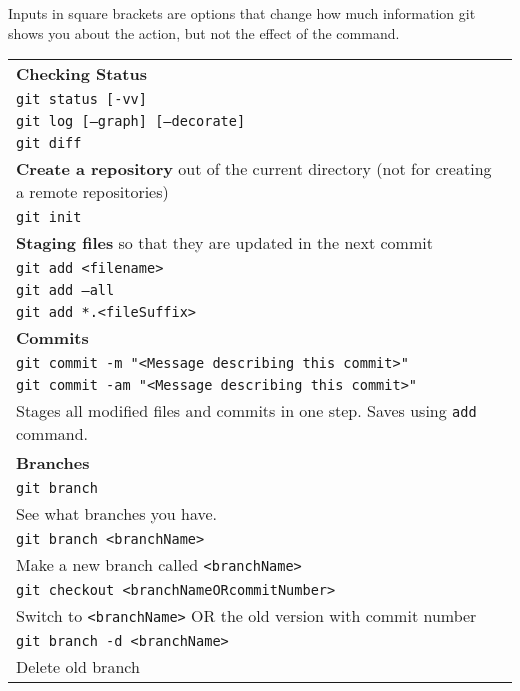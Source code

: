 \documentclass[11pt]{article}
\newcommand{\smallbold}[1]{\footnotesize\textbf{#1}}
\begin{document}
{\small Inputs in square brackets are options that change how much information git shows you about the action, but not the effect of the command.

\begin{center}
\begin{tabular}{|l|}
\hline
\smallbold{Checking Status}\\
\quad \texttt{git status [-vv]}\\

\quad\texttt{git log [--graph] [--decorate]}\\

\quad \texttt{git diff}\\

\hline
\smallbold{Create a repository} out of the current directory (not for creating a remote repositories)\\
\quad \texttt{git init}\\
\hline
\smallbold{Staging files} so that they are updated in the next commit\\
\quad \texttt{git add <filename>}\\

\quad \texttt{git add --all}\\

\quad \texttt{git add *.<fileSuffix>}\\
\hline
\smallbold{Commits}\\
 \quad \texttt{git commit -m "<Message describing this commit>"}\\

\quad \texttt{git commit -am "<Message describing this commit>"}\\
\quad \quad Stages all modified files and commits in one step.  Saves using \texttt{add} command.\\

\hline
\smallbold{Branches}\\

\quad \texttt{git branch}\\
\quad\quad See what branches you have.\\ 

\quad \texttt{git branch <branchName>} \\
\quad \quad Make a new branch called \texttt{<branchName>}\\

\quad \texttt{git checkout <branchNameORcommitNumber>} \\
\quad \quad Switch to \texttt{<branchName>} OR the old version with commit number\\
\quad \texttt{git branch -d <branchName>}\\
\quad\quad Delete old branch\\



\end{tabular}
\end{center}}
\end{document}
